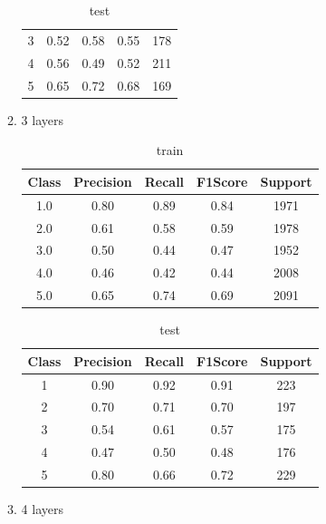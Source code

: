 \begin{enumerate}[label=(\alph*)]
\begin{enumerate}[label=\roman*.]
\begin{table}[!htb]
\begin{tabular}{ccccc}
            3     & 0.52      & 0.58   & 0.55    & 178     \\
            4     & 0.56      & 0.49   & 0.52    & 211     \\
            5     & 0.65      & 0.72   & 0.68    & 169     \\ \hline
            \end{tabular}
            \caption{test}
            \label{part f test depth 2}
        \end{table}
        \newpage
        \item 3 layers
        \begin{table}[!htb]
            \centering
            \begin{tabular}{ccccc}
            \hline
            Class & Precision & Recall & F1Score & Support \\ \hline
            1.0   & 0.80      & 0.89   & 0.84    & 1971    \\
            2.0   & 0.61      & 0.58   & 0.59    & 1978    \\
            3.0   & 0.50      & 0.44   & 0.47    & 1952    \\
            4.0   & 0.46      & 0.42   & 0.44    & 2008    \\
            5.0   & 0.65      & 0.74   & 0.69    & 2091    \\ \hline
            \end{tabular}
            \caption{train}
            \label{part f train depth 3}
        \end{table}
        \begin{table}[!htb]
            \centering
            \begin{tabular}{ccccc}
            \hline
            Class & Precision & Recall & F1Score & Support \\ \hline
            1     & 0.90      & 0.92   & 0.91    & 223     \\
            2     & 0.70      & 0.71   & 0.70    & 197     \\
            3     & 0.54      & 0.61   & 0.57    & 175     \\
            4     & 0.47      & 0.50   & 0.48    & 176     \\
            5     & 0.80      & 0.66   & 0.72    & 229     \\ \hline
            \end{tabular}
            \caption{test}
            \label{part f test depth 3}
        \end{table}
        \item 4 layers

\end{enumerate}
\end{enumerate}
